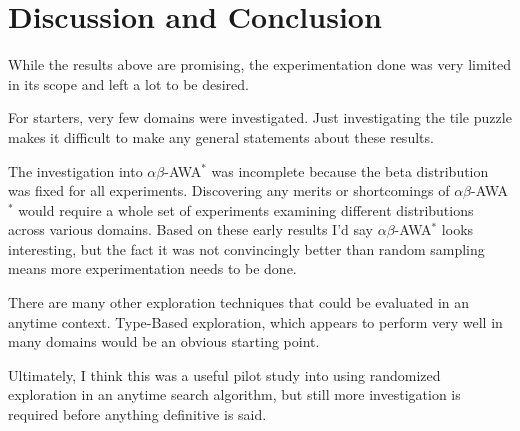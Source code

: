\section{Discussion and Conclusion}
While the results above are promising, the experimentation done was very limited in its scope and left a lot to be desired. 

For starters, very few domains were investigated. Just investigating the tile puzzle makes it difficult to make any general statements about these results. 

The investigation into $\alpha \beta$-AWA$^*$ was incomplete because the beta distribution was fixed for all experiments. Discovering any merits or shortcomings of $\alpha \beta$-AWA$^*$ would require a whole set of experiments examining different distributions across various domains. Based on these early results I'd say $\alpha \beta$-AWA$^*$ looks interesting, but the fact it was not convincingly better than random sampling means more experimentation needs to be done. 

There are many other exploration techniques that could be evaluated in an anytime context. Type-Based exploration, which appears to perform very well in many domains would be an obvious starting point. 

Ultimately, I think this was a useful pilot study into using randomized exploration in an anytime search algorithm, but still more investigation is required before anything definitive is said.